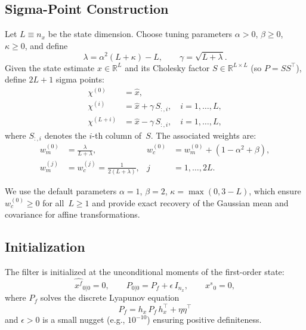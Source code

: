 \documentclass[12pt,a4paper]{article}
\newcommand{\R}{\mathbb{R}}
\newcommand{\xf}{{x^{f}}}
\newcommand{\xs}{{x^{s}}}
\newcommand{\hx}{h_x}
\begin{document}
\subsection{Sigma-Point Construction}\label{sec:sigma}

Let $L \equiv n_x$ be the state dimension. Choose tuning parameters
$\alpha > 0$, $\beta \geq 0$, $\kappa \geq 0$, and define
\begin{equation}\label{eq:lambda}
\lambda = \alpha^2(L + \kappa) - L, \qquad
\gamma = \sqrt{L + \lambda}.
\end{equation}
Given the state estimate $\hat{x} \in \R^L$ and its Cholesky factor
$S \in \R^{L \times L}$ (so $P = SS^\top$), define $2L + 1$
sigma points:
\begin{align}
\chi^{(0)} &= \hat{x}, \label{eq:sp0}\\
\chi^{(i)} &= \hat{x} + \gamma\,S_{:,i},
  \quad i = 1, \ldots, L, \label{eq:sp-plus}\\
\chi^{(L+i)} &= \hat{x} - \gamma\,S_{:,i},
  \quad i = 1, \ldots, L, \label{eq:sp-minus}
\end{align}
where $S_{:,i}$ denotes the $i$-th column of~$S$. The associated
weights are:
\begin{align}
w_m^{(0)} &= \frac{\lambda}{L + \lambda}, &
w_c^{(0)} &= w_m^{(0)} + (1 - \alpha^2 + \beta),
  \label{eq:w0} \\
w_m^{(j)} &= w_c^{(j)} = \frac{1}{2(L + \lambda)},
  &j &= 1, \ldots, 2L. \label{eq:wj}
\end{align}

We use the default parameters $\alpha = 1$, $\beta = 2$,
$\kappa = \max(0, 3 - L)$, which ensure $w_c^{(0)} \geq 0$ for
all~$L \geq 1$ and provide exact recovery of the Gaussian mean and
covariance for affine transformations.

\subsection{Initialization}\label{sec:init}

The filter is initialized at the unconditional moments of the
first-order state:
\begin{equation}\label{eq:init}
\hat{\xf}_{0|0} = 0, \qquad
P_{0|0} = P_f + \epsilon\,I_{n_x}, \qquad
\xs_0 = 0,
\end{equation}
where $P_f$ solves the discrete Lyapunov equation
\begin{equation}\label{eq:lyapunov}
P_f = \hx\,P_f\,\hx^\top + \eta\eta^\top
\end{equation}
and $\epsilon > 0$ is a small nugget (e.g., $10^{-10}$) ensuring
positive definiteness.
\end{document}
